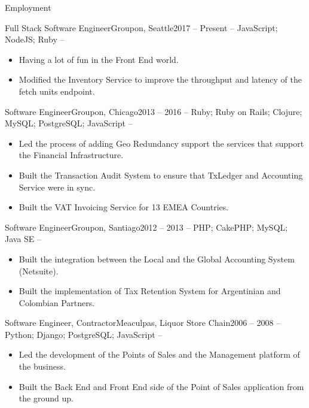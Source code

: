 \documentclass[]{mcdowellcv}
\begin{document}
	\makeheader
	\begin{cvsection}{Employment}
		\begin{cvsubsection}{Full Stack Software Engineer}{Groupon, Seattle}{2017 -- Present}
			 -- JavaScript; NodeJS; Ruby --
			\begin{itemize}
			 	\item Having a lot of fun in the Front End world.
				\item Modified the Inventory Service to improve the throughput and latency of the fetch units endpoint.
			\end{itemize}
		\end{cvsubsection}
		\begin{cvsubsection}{Software Engineer}{Groupon, Chicago}{2013 -- 2016}
			 -- Ruby; Ruby on Rails; Clojure; MySQL; PostgreSQL; JavaScript --
			\begin{itemize}
				\item Led the process of adding Geo Redundancy support the services that support the Financial Infrastructure.
				\item Built the Transaction Audit System to ensure that TxLedger and Accounting Service were in sync.
				\item Built the VAT Invoicing Service for 13 EMEA Countries.
			\end{itemize}
		\end{cvsubsection}
		\begin{cvsubsection}{Software Engineer}{Groupon, Santiago}{2012 -- 2013}
			 -- PHP; CakePHP; MySQL; Java SE --
			\begin{itemize}
				\item Built the integration between the Local and the Global Accounting System (Netsuite).
				\item Built the implementation of Tax Retention System for Argentinian and Colombian Partners.
			\end{itemize}
		\end{cvsubsection}		
		\begin{cvsubsection}{Software Engineer, Contractor}{Meaculpas, Liquor Store Chain}{2006 -- 2008}
			-- Python; Django; PostgreSQL; JavaScript --
			\begin{itemize}
				\item Led the development of the Points of Sales and the Management platform of the business.
				\item Built the Back End and Front End side of the Point of Sales application from the ground up.

\end{itemize}
\end{cvsubsection}
\end{cvsection}
\end{document}
